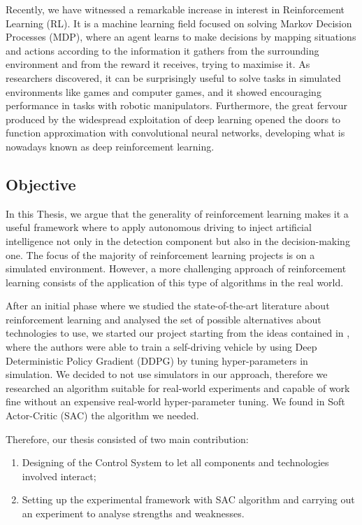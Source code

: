 \documentclass[10pt,twocolumn,letterpaper]{article}
\begin{document}
Recently, we have witnessed a remarkable increase in interest in Reinforcement Learning (RL). It is a machine learning field focused on solving Markov Decision Processes (MDP), where an agent learns to make decisions by mapping situations and actions according to the information it gathers from the surrounding environment and from the reward it receives, trying to maximise it.
As researchers discovered, it can be surprisingly useful to solve tasks in simulated environments like games and computer games, and it showed encouraging performance in tasks with robotic manipulators. Furthermore, the great fervour produced by the widespread exploitation of deep learning opened the doors to function approximation with convolutional neural networks, developing what is nowadays known as deep reinforcement learning.

\subsection{Objective}

In this Thesis, we argue that the generality of reinforcement learning makes it a useful framework where to apply autonomous driving to inject artificial intelligence not only in the detection component but also in the decision-making one.
The focus of the majority of reinforcement learning projects is on a simulated environment. However, a more challenging approach of reinforcement learning consists of the application of this type of algorithms in the real world.

After an initial phase where we studied the state-of-the-art literature about reinforcement learning and analysed the set of possible alternatives about technologies to use, we started our project starting from the ideas contained in \cite{kendall2019learning}, where the authors were able to train a self-driving vehicle by using Deep Deterministic Policy Gradient (DDPG) \cite{lillicrap2015continuous} by tuning hyper-parameters in simulation. We decided to not use simulators in our approach, therefore we researched an algorithm suitable for real-world experiments and capable of work fine without an expensive real-world hyper-parameter tuning. We found in Soft Actor-Critic (SAC) \cite{haarnoja2018soft} the algorithm we needed.

Therefore, our thesis consisted of two main contribution:
\begin{enumerate}
    \item Designing of the Control System to let all components and technologies involved interact;
    \item Setting up the experimental framework with SAC algorithm and carrying out an experiment to analyse strengths and weaknesses.
\end{enumerate}
\end{document}
